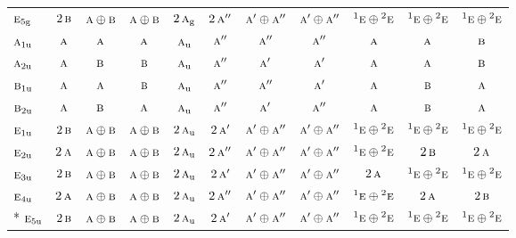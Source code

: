 \documentclass[10pt,a4paper]{article}
\numberwithin{equation}{section}
\newcommand{\irr}[1]{\text{\normalfont\scshape #1}}
\newcommand{\conjpair}[1]{{}^{#1}}
\newcommand{\ptag}[1]{\mathrm{#1}}
\begin{document}
{\begin{longtable}{@{}lcccccccccc@{}}
$\irr{e}_{5\ptag{g}}$ & $2\,\irr{b}$ & $\irr{a}\oplus \irr{b}$ & $\irr{a}\oplus \irr{b}$ & $2\,\irr{a}_{\ptag{g}}$ & $2\,\irr{a}''$ & $\irr{a}'\oplus \irr{a}''$ & $\irr{a}'\oplus \irr{a}''$ & $\conjpair{1}\irr{e}\oplus \conjpair{2}\irr{e}$ & $\conjpair{1}\irr{e}\oplus \conjpair{2}\irr{e}$ & $\conjpair{1}\irr{e}\oplus \conjpair{2}\irr{e}$\\
$\irr{a}_{1\ptag{u}}$ & $\irr{a}$ & $\irr{a}$ & $\irr{a}$ & $\irr{a}_{\ptag{u}}$ & $\irr{a}''$ & $\irr{a}''$ & $\irr{a}''$ & $\irr{a}$ & $\irr{a}$ & $\irr{b}$\\
$\irr{a}_{2\ptag{u}}$ & $\irr{a}$ & $\irr{b}$ & $\irr{b}$ & $\irr{a}_{\ptag{u}}$ & $\irr{a}''$ & $\irr{a}'$ & $\irr{a}'$ & $\irr{a}$ & $\irr{a}$ & $\irr{b}$\\
$\irr{b}_{1\ptag{u}}$ & $\irr{a}$ & $\irr{a}$ & $\irr{b}$ & $\irr{a}_{\ptag{u}}$ & $\irr{a}''$ & $\irr{a}''$ & $\irr{a}'$ & $\irr{a}$ & $\irr{b}$ & $\irr{a}$\\
$\irr{b}_{2\ptag{u}}$ & $\irr{a}$ & $\irr{b}$ & $\irr{a}$ & $\irr{a}_{\ptag{u}}$ & $\irr{a}''$ & $\irr{a}'$ & $\irr{a}''$ & $\irr{a}$ & $\irr{b}$ & $\irr{a}$\\
$\irr{e}_{1\ptag{u}}$ & $2\,\irr{b}$ & $\irr{a}\oplus \irr{b}$ & $\irr{a}\oplus \irr{b}$ & $2\,\irr{a}_{\ptag{u}}$ & $2\,\irr{a}'$ & $\irr{a}'\oplus \irr{a}''$ & $\irr{a}'\oplus \irr{a}''$ & $\conjpair{1}\irr{e}\oplus \conjpair{2}\irr{e}$ & $\conjpair{1}\irr{e}\oplus \conjpair{2}\irr{e}$ & $\conjpair{1}\irr{e}\oplus \conjpair{2}\irr{e}$\\
$\irr{e}_{2\ptag{u}}$ & $2\,\irr{a}$ & $\irr{a}\oplus \irr{b}$ & $\irr{a}\oplus \irr{b}$ & $2\,\irr{a}_{\ptag{u}}$ & $2\,\irr{a}''$ & $\irr{a}'\oplus \irr{a}''$ & $\irr{a}'\oplus \irr{a}''$ & $\conjpair{1}\irr{e}\oplus \conjpair{2}\irr{e}$ & $2\,\irr{b}$ & $2\,\irr{a}$\\
$\irr{e}_{3\ptag{u}}$ & $2\,\irr{b}$ & $\irr{a}\oplus \irr{b}$ & $\irr{a}\oplus \irr{b}$ & $2\,\irr{a}_{\ptag{u}}$ & $2\,\irr{a}'$ & $\irr{a}'\oplus \irr{a}''$ & $\irr{a}'\oplus \irr{a}''$ & $2\,\irr{a}$ & $\conjpair{1}\irr{e}\oplus \conjpair{2}\irr{e}$ & $\conjpair{1}\irr{e}\oplus \conjpair{2}\irr{e}$\\
$\irr{e}_{4\ptag{u}}$ & $2\,\irr{a}$ & $\irr{a}\oplus \irr{b}$ & $\irr{a}\oplus \irr{b}$ & $2\,\irr{a}_{\ptag{u}}$ & $2\,\irr{a}''$ & $\irr{a}'\oplus \irr{a}''$ & $\irr{a}'\oplus \irr{a}''$ & $\conjpair{1}\irr{e}\oplus \conjpair{2}\irr{e}$ & $2\,\irr{a}$ & $2\,\irr{b}$\\*
$\irr{e}_{5\ptag{u}}$ & $2\,\irr{b}$ & $\irr{a}\oplus \irr{b}$ & $\irr{a}\oplus \irr{b}$ & $2\,\irr{a}_{\ptag{u}}$ & $2\,\irr{a}'$ & $\irr{a}'\oplus \irr{a}''$ & $\irr{a}'\oplus \irr{a}''$ & $\conjpair{1}\irr{e}\oplus \conjpair{2}\irr{e}$ & $\conjpair{1}\irr{e}\oplus \conjpair{2}\irr{e}$ & $\conjpair{1}\irr{e}\oplus \conjpair{2}\irr{e}$\\
\bottomrule\end{longtable}}
\end{document}

